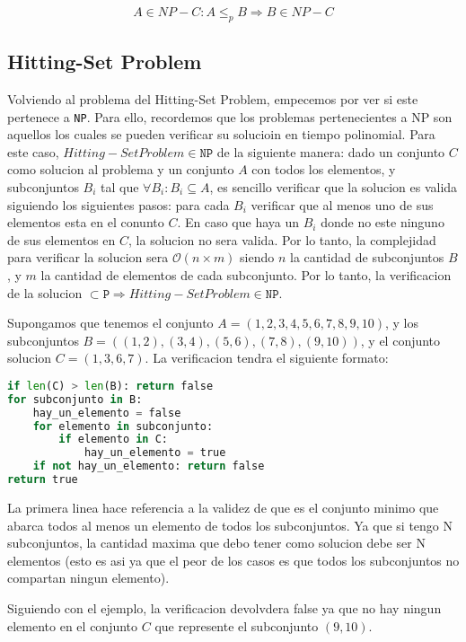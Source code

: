 \[ A \in {NP-C}: A \leq _p B \Rightarrow B \in NP-C \]

\subsection{Hitting-Set Problem}

Volviendo al problema del Hitting-Set Problem, empecemos por ver si este pertenece a \texttt{NP}. Para ello, recordemos que los problemas pertenecientes a NP son aquellos los cuales se pueden verificar su solucioin en tiempo polinomial. Para este caso, $Hitting-Set Problem \in \texttt{NP}$ de la siguiente manera: dado un conjunto $C$ como solucion al problema y un conjunto $A$ con todos los elementos, y subconjuntos $B_i$ tal que $\forall B_i: B_i \subseteq A$, es sencillo verificar que la solucion es valida siguiendo los siguientes pasos: para cada $B_i$ verificar que al menos uno de sus elementos esta en el conunto $C$. En caso que haya un $B_i$ donde no este ninguno de sus elementos en $C$, la solucion no sera valida. Por lo tanto, la complejidad para verificar la solucion sera $\mathcal{O}(n \times m)$ siendo $n$ la cantidad de subconjuntos $B$, y $m$ la cantidad de elementos de cada subconjunto. Por lo tanto, la verificacion de la solucion $\subset \texttt{P} \Rightarrow Hitting-Set Problem \in \texttt{NP}$.

Supongamos que tenemos el conjunto $A = (1, 2, 3, 4, 5, 6, 7, 8, 9, 10)$, y los subconjuntos $B = ((1, 2), (3, 4), (5, 6), (7, 8), (9, 10))$, y el conjunto solucion $C = (1, 3, 6, 7)$. La verificacion tendra el siguiente formato:

\begin{lstlisting}[language=Python]
if len(C) > len(B): return false
for subconjunto in B:
    hay_un_elemento = false
    for elemento in subconjunto:
        if elemento in C:
            hay_un_elemento = true
    if not hay_un_elemento: return false
return true
\end{lstlisting}

La primera linea hace referencia a la validez de que es el conjunto minimo que abarca todos al menos un elemento de todos los subconjuntos. Ya que si tengo N subconjuntos, la cantidad maxima que debo tener como solucion debe ser N elementos (esto es asi ya que el peor de los casos es que todos los subconjuntos no compartan ningun elemento).

Siguiendo con el ejemplo, la verificacion devolvdera false ya que no hay ningun elemento en el conjunto $C$ que represente el subconjunto $(9, 10)$.

